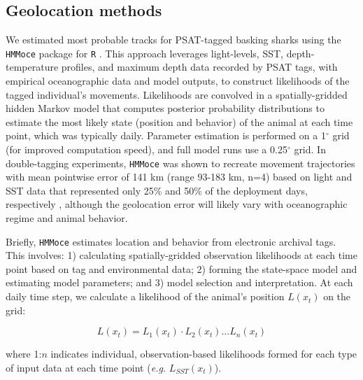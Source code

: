 \subsection{Geolocation methods}
We estimated most probable tracks for PSAT-tagged basking sharks using the \texttt{HMMoce} package \citep{Braun2018a} for \texttt{R} \citep{RDevelopmentCoreTeam2015}. This approach leverages light-levels, SST, depth-temperature profiles, and maximum depth data recorded by PSAT tags, with empirical oceanographic data and model outputs, to construct likelihoods of the tagged individual's movements. Likelihoods are convolved in a spatially-gridded hidden Markov model that computes posterior probability distributions to estimate the most likely state (position and behavior) of the animal at each time point, which was typically daily. Parameter estimation is performed on a 1$^{\circ}$ grid (for improved computation speed), and full model runs use a 0.25$^{\circ}$ grid. In double-tagging experiments, \texttt{HMMoce} was shown to recreate movement trajectories with mean pointwise error of 141 km (range 93-183 km, n=4) based on light and SST data that represented only 25\% and 50\% of the deployment days, respectively \citep{Braun2018a}, although the geolocation error will likely vary with oceanographic regime and animal behavior.

Briefly, \texttt{HMMoce} estimates location and behavior from electronic archival tags. This involves: 1) calculating spatially-gridded observation likelihoods at each time point based on tag and environmental data; 2) forming the state-space model and estimating model parameters; and 3) model selection and interpretation. At each daily time step, we calculate a likelihood of the animal's position $L(x_t)$ on the grid:

\begin{equation}
\label{eq:c3e1}
L(x_t) = L_1(x_t) \cdot L_2(x_t) ... L_n(x_t)
\end{equation}

where 1:$n$ indicates individual, observation-based likelihoods formed for each type of input data at each time point (\emph{e.g.} $L_{SST}(x_t)$).

